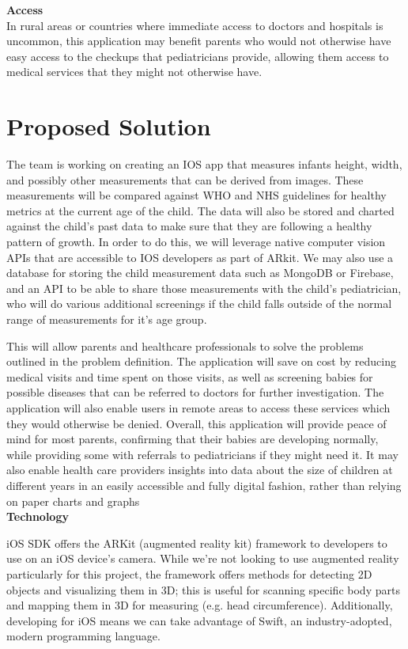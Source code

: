 \documentclass[10pt, draftclsnofoot, letterpaper, margin=.75in, onecolumn]{IEEEtran}
\begin{document}
\textbf{Access}\\
In rural areas or countries where immediate access to doctors and hospitals is uncommon, this application may benefit parents who would not otherwise have easy access to the checkups that pediatricians provide, allowing them access to medical services that they might not otherwise have.

\section{Proposed Solution}
\par \noindent The team is working on creating an IOS app that measures infants height, width, and possibly other measurements that can be derived from images. These measurements will be compared against WHO and NHS guidelines for healthy metrics at the current age of the child. The data will also be stored and charted against the child’s past data to make sure that they are following a healthy pattern of growth. In order to do this, we will leverage native computer vision APIs that are accessible to IOS developers as part of ARkit. We may also use a database for storing the child measurement data such as MongoDB or Firebase, and an API to be able to share those measurements with the child’s pediatrician, who will do various additional screenings if the child falls outside of the normal range of measurements for it’s age group.\\

\par \noindent This will allow parents and healthcare professionals to solve the problems outlined in the problem definition. The application will save on cost by reducing medical visits and time spent on those visits, as well as screening babies for possible diseases that can be referred to doctors for further investigation. The application will also enable users in remote areas to access these services which they would otherwise be denied. Overall, this application will provide peace of mind for most parents, confirming that their babies are developing normally, while providing some with referrals to pediatricians if they might need it. It may also enable health care providers insights into data about the size of children at different years in an easily accessible and fully digital fashion, rather than relying on paper charts and graphs\\

\textbf{Technology}
\par \noindent iOS SDK offers the ARKit (augmented reality kit) framework to developers to use on an iOS device's camera. While we're not looking to use augmented reality particularly for this project, the framework offers methods for detecting 2D objects and visualizing them in 3D; this is useful for scanning specific body parts and mapping them in 3D for measuring (e.g. head circumference). Additionally, developing for iOS means we can take advantage of Swift, an industry-adopted, modern programming language. \\
\end{document}
